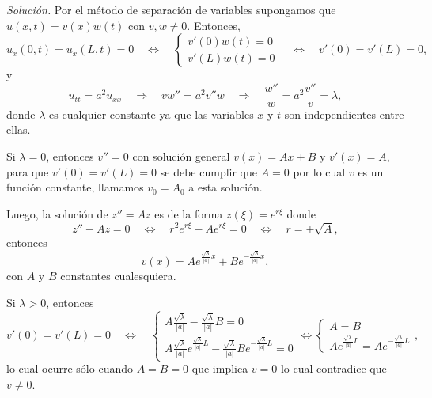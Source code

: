 \documentclass[12pt]{article}
\newcommand{\sol}{\textit{Solución. }}
\newcommand{\Imp}{\quad\Longrightarrow\quad}
\newcommand{\ssi}{\Longleftrightarrow}
\newcommand{\Ssi}{\quad\Longleftrightarrow\quad}
\renewcommand{\l}{\lambda}
\begin{document}
\begin{enumerate}
\begin{enumerate}
            \sol Por el método de separación de variables supongamos que $u(x,t)=v(x)w(t)$ con $v, w\neq 0$. Entonces,
            \[ u_x(0,t)=u_x(L,t)=0\Ssi\begin{cases}
                v'(0)w(t)=0\\
                v'(L)w(t)=0
            \end{cases}\Ssi  v'(0)=v'(L)=0,\]
            y
            \[ u_{tt} = a^2 u_{xx} \Imp vw''=a^2 v''w\Imp\frac{w''}{w}=a^2\frac{v''}{v}=\l, \]
            donde $\l$ es cualquier constante ya que las variables $x$ y $t$ son independientes entre ellas.

            Si $\l=0$, entonces $v''=0$ con solución general $v(x)=Ax+B$ y $v'(x)=A$, para que $v'(0)=v'(L)=0$ se debe cumplir que $A=0$ por lo cual $v$ es un función constante, llamamos $v_0=A_0$ a esta solución.
    
            Luego, la solución de $z''=Az$ es de la forma $z(\xi)=e^{r\xi}$ donde
            \[ z''-Az=0\Ssi r^2e^{r\xi}-Ae^{r\xi}=0\Ssi r=\pm\sqrt{A}, \]
            entonces
            $$v(x)=Ae^{\tfrac{\sqrt{\l}}{|a|}x}+Be^{-\tfrac{\sqrt{\l}}{|a|}x},$$
            con $A$ y $B$ constantes cualesquiera.
            
            Si $\l>0$, entonces
            \[ 
            v'(0)=v'(L)=0\Ssi \begin{cases}
                A\tfrac{\sqrt{\l}}{|a|}-\tfrac{\sqrt{\l}}{|a|} B=0\\
                A\tfrac{\sqrt{\l}}{|a|}e^{\tfrac{\sqrt{\l}}{|a|}L}-\tfrac{\sqrt{\l}}{|a|} Be^{-\tfrac{\sqrt{\l}}{|a|}L} =0
            \end{cases}
            \ssi
            \begin{cases}
                A=B\\
                Ae^{\tfrac{\sqrt{\l}}{|a|}L} =Ae^{-\tfrac{\sqrt{\l}}{|a|}L}
            \end{cases},
            \]
            lo cual ocurre sólo cuando $A=B=0$ que implica $v=0$ lo cual contradice que $v\neq 0$.
            

\end{enumerate}
\end{enumerate}
\end{document}
